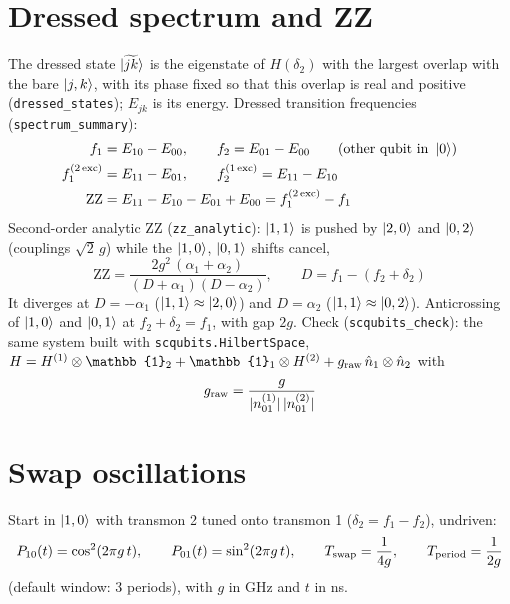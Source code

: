 \documentclass[11pt]{article}
\newcommand{\id}{\mathbb{1}}
\begin{document}
\section*{Dressed spectrum and ZZ}
The dressed state $\ket{\widetilde{jk}}$ is the eigenstate of $H(\delta_2)$ with the largest overlap
with the bare $\ket{j,k}$, with its phase fixed so that this overlap is real and positive
(\texttt{dressed\_states}); $E_{jk}$ is its energy. Dressed transition frequencies
(\texttt{spectrum\_summary}):
\begin{align}
  f_1 &= E_{10} - E_{00}, \qquad f_2 = E_{01} - E_{00} \qquad \text{(other qubit in } \ket{0}) \\
  f_1^{(2\,{\rm exc})} &= E_{11} - E_{01}, \qquad f_2^{(1\,{\rm exc})} = E_{11} - E_{10} \\
  \mathrm{ZZ} &= E_{11} - E_{10} - E_{01} + E_{00} = f_1^{(2\,{\rm exc})} - f_1
\end{align}
Second-order analytic ZZ (\texttt{zz\_analytic}): $\ket{1,1}$ is pushed by $\ket{2,0}$ and
$\ket{0,2}$ (couplings $\sqrt2\,g$) while the $\ket{1,0}$, $\ket{0,1}$ shifts cancel,
\begin{equation}
  \mathrm{ZZ} = \frac{2g^2\,(\alpha_1 + \alpha_2)}{(D + \alpha_1)(D - \alpha_2)}, \qquad
  D = f_1 - (f_2 + \delta_2)
\end{equation}
It diverges at $D = -\alpha_1$ ($\ket{1,1}\approx\ket{2,0}$) and $D = \alpha_2$
($\ket{1,1}\approx\ket{0,2}$).
Anticrossing of $\ket{1,0}$ and $\ket{0,1}$ at $f_2 + \delta_2 = f_1$, with gap $2g$.
Check (\texttt{scqubits\_check}): the same system built with \texttt{scqubits.HilbertSpace},
$H = H^{(1)}\otimes\id_2 + \id_1\otimes H^{(2)} + g_{\rm raw}\,\hat n_1\otimes\hat n_2$ with
\begin{equation}
  g_{\rm raw} = \frac{g}{|n^{(1)}_{01}|\,|n^{(2)}_{01}|}
\end{equation}

\section*{Swap oscillations}
Start in $\ket{1,0}$ with transmon 2 tuned onto transmon 1 ($\delta_2 = f_1 - f_2$), undriven:
\begin{equation}
  P_{10}(t) = \cos^2(2\pi g\,t), \qquad P_{01}(t) = \sin^2(2\pi g\,t), \qquad
  T_{\rm swap} = \frac{1}{4g}, \qquad T_{\rm period} = \frac{1}{2g}
\end{equation}
(default window: 3 periods), with $g$ in GHz and $t$ in ns.
\end{document}
